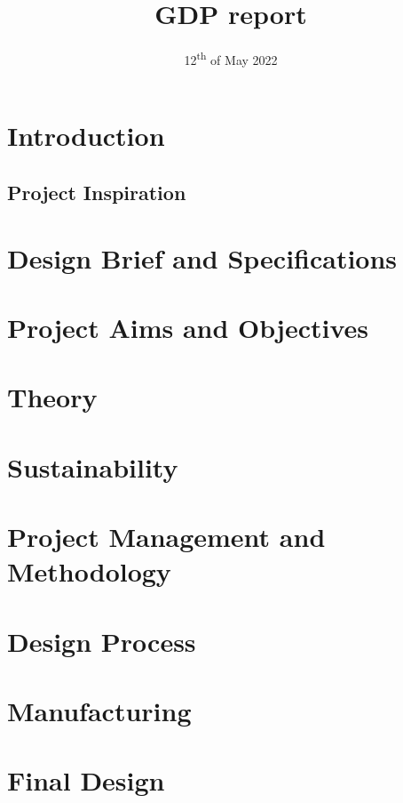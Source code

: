 \documentclass{article}
\title{GDP report}
\date{12\textsuperscript{th} of May 2022}
\begin{document}



\tableofcontents
\newpage

\section{Introduction}

\subsection{Project Inspiration}


\section{Design Brief and Specifications}


\section{Project Aims and Objectives}


\section{Theory}


\section{Sustainability}


\section{Project Management and Methodology}


\section{Design Process}


\section{Manufacturing}


\section{Final Design}
\end{document}
